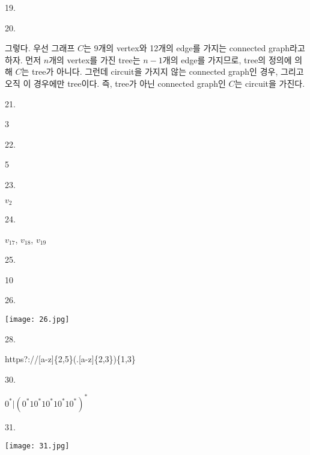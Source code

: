 \documentclass{article}
\begin{document}
19.
\begin{addmargin}[1em]{2em}

\end{addmargin}
\bigskip

20.
\begin{addmargin}[1em]{2em}
그렇다.
우선 그래프 $C$는 9개의 vertex와 12개의 edge를 가지는 connected graph라고 하자. 먼저 $n$개의 vertex를 가진 tree는 $n-1$개의 edge를 가지므로, tree의 정의에 의해 $C$는 tree가 아니다. 그런데 circuit을 가지지 않는 connected graph인 경우, 그리고 오직 이 경우에만 tree이다. 즉, tree가 아닌 connected graph인 $C$는 circuit을 가진다.
\end{addmargin}
\bigskip

21.
\begin{addmargin}[1em]{2em}
3
\end{addmargin}
\bigskip

22.
\begin{addmargin}[1em]{2em}
5
\end{addmargin}
\bigskip

23.
\begin{addmargin}[1em]{2em}
$v_2$
\end{addmargin}
\bigskip

24.
\begin{addmargin}[1em]{2em}
$v_{17}$, $v_{18}$, $v_{19}$
\end{addmargin}
\bigskip

25.
\begin{addmargin}[1em]{2em}
10
\end{addmargin}
\bigskip

26.
\begin{addmargin}[1em]{2em}
\texttt{[image: 26.jpg]}
\end{addmargin}
\bigskip

28.
\begin{addmargin}[1em]{2em}
https?://[a-z]\{2,5\}(.[a-z]\{2,3\})\{1,3\}
\end{addmargin}
\bigskip

30.
\begin{addmargin}[1em]{2em}
$0^*|(0^* 1 0^* 1 0^* 1 0^* 1 0^*)^*$
\end{addmargin}
\bigskip

31.
\begin{addmargin}[1em]{2em}
\texttt{[image: 31.jpg]}
\end{addmargin}
\bigskip
\end{document}
